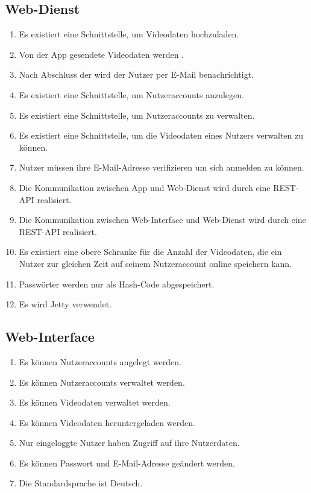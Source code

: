 \subsection{Web-Dienst}
	\begin{enumerate}
	\renewcommand{\labelenumi}{\textbf{\theenumi}}
	\renewcommand{\theenumi}{PK\arabic{enumi}0}
	\setcounter{enumi}{199}
	\item Es existiert eine Schnittstelle, um Videodaten hochzuladen.
	\item Von der \gls{App} gesendete Videodaten werden .
	\item Nach Abschluss der  wird der Nutzer per \gls{E-Mail} benachrichtigt.
	\item Es existiert eine Schnittstelle, um Nutzeraccounts anzulegen.
	\item Es existiert eine Schnittstelle, um Nutzeraccounts zu verwalten.
	\item Es existiert eine Schnittstelle, um die Videodaten eines Nutzers verwalten zu können.
	\item Nutzer müssen ihre \gls{E-Mail}-Adresse verifizieren um sich anmelden zu können.
	\item Die Kommunikation zwischen App und Web-Dienst wird durch eine REST-\gls{API} realisiert.
	\item Die Kommunikation zwischen \gls{Web-Interface} und \gls{Web-Dienst} wird durch eine REST-\gls{API} realisiert.
	\item Es existiert eine obere Schranke für die Anzahl der Videodaten, die ein Nutzer zur gleichen Zeit auf seinem Nutzeraccount online speichern kann.
	\item Passwörter werden nur als \gls{Hash-Code} abgespeichert.
	\item Es wird Jetty verwendet.
	\end{enumerate}
\subsection{Web-Interface}
	\begin{enumerate}
	\renewcommand{\labelenumi}{\textbf{\theenumi}}
	\renewcommand{\theenumi}{PK\arabic{enumi}0}
	\setcounter{enumi}{299}
	\item Es können Nutzeraccounts angelegt werden.
	\item Es können Nutzeraccounts verwaltet werden.
	\item Es können Videodaten verwaltet werden.
	\item Es können Videodaten heruntergeladen werden.
	\item Nur eingeloggte Nutzer haben Zugriff auf ihre Nutzerdaten.
	\item Es können Passwort und \gls{E-Mail}-Adresse geändert werden.
	\item Die Standardsprache ist Deutsch.
	\end{enumerate}

